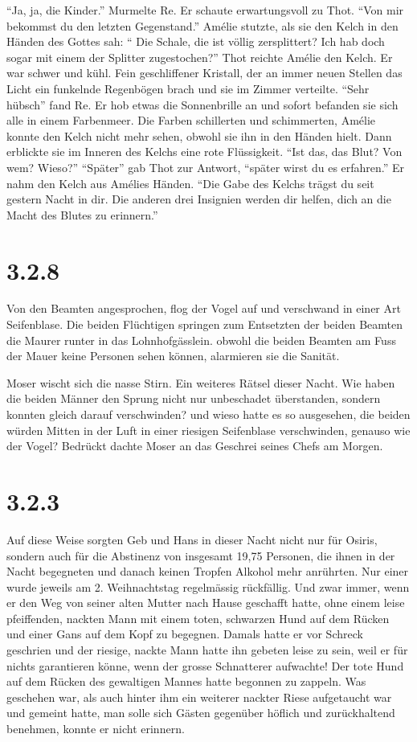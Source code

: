 \documentclass[11pt,titlepage,a5paper]{book}
\begin{document}
"`Ja, ja, die Kinder."' Murmelte Re. Er schaute erwartungsvoll zu Thot. "`Von mir bekommst du den letzten Gegenstand."' Amélie stutzte, als sie den Kelch in den Händen des Gottes sah: "` Die Schale, die ist völlig zersplittert? Ich hab doch sogar mit einem der Splitter zugestochen?"' Thot reichte Amélie den Kelch. Er war schwer und kühl. Fein geschliffener Kristall, der an immer neuen Stellen das Licht ein funkelnde Regenbögen brach und sie im Zimmer verteilte. "`Sehr hübsch"' fand Re. Er hob etwas die Sonnenbrille an und sofort befanden sie sich alle in einem Farbenmeer. Die Farben schillerten und schimmerten, Amélie konnte den Kelch nicht mehr sehen, obwohl sie ihn in den Händen hielt. Dann erblickte sie im Inneren des Kelchs eine rote Flüssigkeit. "`Ist das, das Blut? Von wem? Wieso?"' "`Später"' gab Thot zur Antwort, "`später wirst du es erfahren."' Er nahm den Kelch aus Amélies Händen. "`Die Gabe des Kelchs trägst du seit gestern Nacht in dir. Die anderen drei Insignien werden dir helfen, dich an die Macht des Blutes zu erinnern."' 

\section*{3.2.8}

Von den Beamten angesprochen, flog der Vogel auf und verschwand in einer Art Seifenblase. Die beiden Flüchtigen springen zum Entsetzten der beiden Beamten die Maurer runter in das Lohnhofgässlein. obwohl die beiden Beamten am Fuss der Mauer keine Personen sehen können, alarmieren sie die Sanität.

Moser wischt sich die nasse Stirn. Ein weiteres Rätsel dieser Nacht. Wie haben die beiden Männer den Sprung nicht nur unbeschadet überstanden, sondern konnten gleich darauf verschwinden? und wieso hatte es so ausgesehen, die beiden würden Mitten in der Luft in einer riesigen Seifenblase verschwinden, genauso wie der Vogel? Bedrückt dachte Moser an das Geschrei seines Chefs am Morgen. 

\section*{3.2.3}
 
 Auf diese Weise sorgten Geb und Hans in dieser Nacht nicht nur für Osiris, sondern auch für die Abstinenz von insgesamt 19,75 Personen, die ihnen in der Nacht begegneten und danach keinen Tropfen Alkohol mehr anrührten. Nur einer wurde jeweils am 2. Weihnachtstag regelmässig rückfällig. Und zwar immer, wenn er den Weg von seiner alten Mutter nach Hause geschafft hatte, ohne einem leise pfeiffenden, nackten Mann mit einem toten, schwarzen Hund auf dem Rücken und einer Gans auf dem Kopf zu begegnen. Damals hatte er vor Schreck geschrien und der riesige, nackte Mann hatte ihn gebeten leise zu sein, weil er für nichts garantieren könne, wenn der grosse Schnatterer aufwachte! Der tote Hund auf dem Rücken des gewaltigen Mannes hatte begonnen zu zappeln. Was geschehen war, als auch hinter ihm ein weiterer nackter Riese aufgetaucht war und gemeint hatte, man solle sich Gästen gegenüber höflich und zurückhaltend benehmen, konnte er nicht erinnern.
\end{document}
